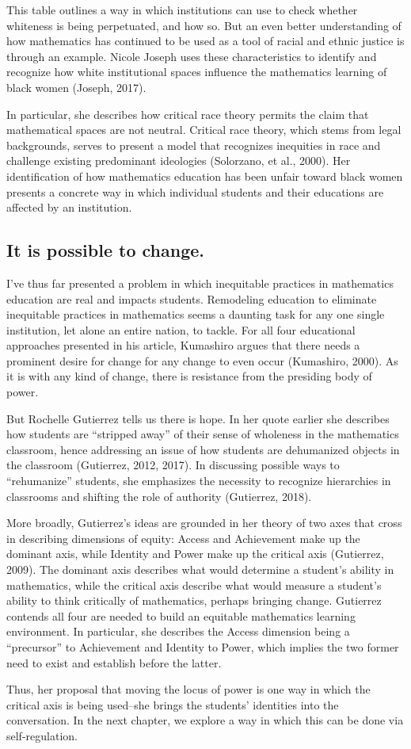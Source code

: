 This table outlines a way in which institutions can use to check whether whiteness is being perpetuated, and how so. But an even better understanding of how mathematics has continued to be used as a tool of racial and ethnic justice is through an example. Nicole Joseph uses these characteristics to identify and recognize how white institutional spaces influence the mathematics learning of black women (Joseph, 2017).

In particular, she describes how critical race theory permits the claim that mathematical spaces are not neutral. Critical race theory, which stems from legal backgrounds, serves to present a model that recognizes inequities in race and challenge existing predominant ideologies (Solorzano, et al., 2000). Her identification of how mathematics education has been unfair toward black women presents a concrete way in which individual students and their educations are affected by an institution.

\subsection{It is possible to change.}
I've thus far presented a problem in which inequitable practices in mathematics education are real and impacts students. Remodeling education to eliminate inequitable practices in mathematics seems a daunting task for any one single institution, let alone an entire nation, to tackle. For all four educational approaches presented in his article, Kumashiro argues that there needs a prominent desire for change for any change to even occur (Kumashiro, 2000). As it is with any kind of change, there is resistance from the presiding body of power.

But Rochelle Gutierrez tells us there is hope. In her quote earlier she describes how students are ``stripped away'' of their sense of wholeness in the mathematics classroom, hence addressing an issue of how students are dehumanized objects in the classroom (Gutierrez, 2012, 2017). In discussing possible ways to ``rehumanize'' students, she emphasizes the necessity to recognize hierarchies in classrooms and shifting the role of authority (Gutierrez, 2018).

More broadly, Gutierrez's ideas are grounded in her theory of two axes that cross in describing dimensions of equity: Access and Achievement make up the dominant axis, while Identity and Power make up the critical axis (Gutierrez, 2009). The dominant axis describes what would determine a student's ability in mathematics, while the critical axis describe what would measure a student's ability to think critically of mathematics, perhaps bringing change. Gutierrez contends all four are needed to build an equitable mathematics learning environment. In particular, she describes the Access dimension being a ``precursor'' to Achievement and Identity to Power, which implies the two former need to exist and establish before the latter.

Thus, her proposal that moving the locus of power is one way in which the critical axis is being used--she brings the students' identities into the conversation. In the next chapter, we explore a way in which this can be done via self-regulation.
